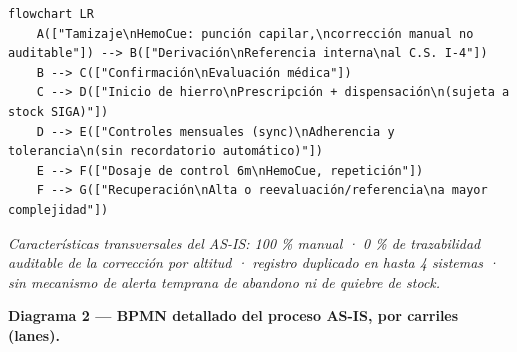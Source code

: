 \documentclass[11pt,a4paper]{article}
\begin{document}
\begin{samepage}\begin{verbatim}
flowchart LR
    A(["Tamizaje\nHemoCue: punción capilar,\ncorrección manual no auditable"]) --> B(["Derivación\nReferencia interna\nal C.S. I-4"])
    B --> C(["Confirmación\nEvaluación médica"])
    C --> D(["Inicio de hierro\nPrescripción + dispensación\n(sujeta a stock SIGA)"])
    D --> E(["Controles mensuales (sync)\nAdherencia y tolerancia\n(sin recordatorio automático)"])
    E --> F(["Dosaje de control 6m\nHemoCue, repetición"])
    F --> G(["Recuperación\nAlta o reevaluación/referencia\na mayor complejidad"])
\end{verbatim}\end{samepage}

\emph{Características transversales del AS-IS: 100 \% manual · 0 \% de trazabilidad auditable de la corrección por altitud · registro duplicado en hasta 4 sistemas · sin mecanismo de alerta temprana de abandono ni de quiebre de stock.}

\textbf{Diagrama 2 --- BPMN detallado del proceso AS-IS, por carriles (lanes).}
\end{document}
